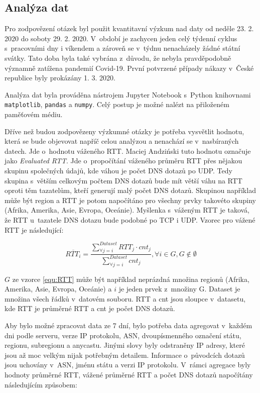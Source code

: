 \documentclass[thesis=M,czech]{src/FITthesis}[2019/12/23]
\begin{document}
\subsection{Analýza dat}
Pro zodpovězení otázek byl použit kvantitavní výzkum nad daty od neděle 23. 2. 2020 do soboty 29. 2. 2020. V~období je zachycen jeden celý týdenní cyklus s~pracovními dny i víkendem a zároveň se v~týdnu nenacházely žádné státní svátky. Tato doba byla také vybrána z~důvodu, že nebyla pravděpodobně významně zatížena pandemií Covid-19. První potvrzené případy nákazy v~České republice byly prokázány 1. 3. 2020. \cite{covid-mzcr, covid-vlada}

Analýza dat byla prováděna nástrojem Jupyter Notebook s~Python knihovnami \texttt{matplotlib}, \texttt{pandas} a \texttt{numpy}. Celý postup je možné nalézt na  přiloženém paměťovém médiu.

Dříve než budou zodpovězeny výzkumné otázky je potřeba vysvětlit hodnotu, která se bude objevovat napříč celou analýzou a nenachází se \linebreak v~nasbíraných datech.  Jde o~hodnotu váženého RTT. Maciej Andziński tuto hodnotu označuje jako \textit{Evaluated RTT}. Jde o~propočítání váženého průměru RTT přes nějakou skupinu společných údajů, kde váhou je počet DNS dotazů po UDP. Tedy skupina s~větším celkovým počtem DNS dotazů bude mít větší váhu na RTT oproti těm tazatelům, kteří generují malý počet DNS dotazů. Skupinou například může být region a RTT je potom napočítáno pro všechny prvky takovéto skupiny (Afrika, Amerika, Asie, Evropa, Oceánie). Myšlenka s~váženým RTT je taková, že RTT u~tazatele DNS dotazu bude podobné po TCP i UDP. Vzorec pro vážené RTT je následující: 

\begin{equation}
\label{equ:RTT}
\overline{RTT_{i}} = \frac{\displaystyle\sum_{\forall j = i}^{Dataset}{RTT_j \cdot cnt_j}}{\displaystyle\sum_{\forall j = i}^{Dataset}{cnt_j}}, 
\forall i \in G, G \notin \emptyset
\end{equation}

$G$ ze vzorce \ref{equ:RTT} může být například neprázdná množina regionů (Afrika, Amerika, Asie, Evropa, Oceánie) a $i$ je jeden prvek z~množiny G. Dataset je množina všech řádků v~datovém souboru. RTT a cnt jsou sloupce v~datasetu, kde RTT je průměrné RTT a cnt je počet DNS dotazů.

Aby bylo možné zpracovat data ze 7 dní, bylo potřeba data agregovat v~každém dni podle serveru, verze IP protokolu, ASN, dvoupísmenného \linebreak označení státu, regionu, subregionu a anycastu. Jinými slovy byly odstraněny IP adresy, které jsou až moc velkým nijak potřebným detailem. Informace o~původcích dotazů jsou uchovány v~ASN, jménu státu a verzi IP protokolu. V~rámci agregace byly hodnoty průměrné RTT, vážené průměrné RTT a počet DNS dotazů napočítány následujícím způsobem: 
\end{document}
